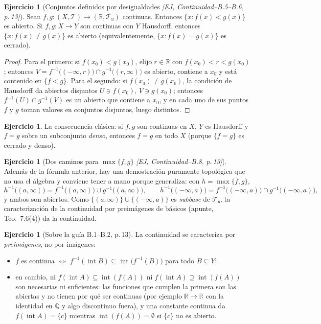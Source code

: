 \documentclass[11pt,a4paper]{article}
\theoremstyle{definition}
\newtheorem{ejercicio}[definicion]{Ejercicio}
\theoremstyle{plain}
\newcommand{\fnt}[1]{{\normalfont\small\itshape\color{gray!150!black}[#1]}}
\newcommand{\R}{\mathbb{R}}
\newcommand{\Q}{\mathbb{Q}}
\newcommand{\intr}{\operatorname{int}}
\newcommand{\tp}{\mathcal{T}}
\begin{document}
\begin{ejercicio}[Conjuntos definidos por desigualdades \fnt{EJ, Continuidad--B.5--B.6, p.\,13}]
Sean $f,g:(X,\tp)\to(\R,\tp_u)$ continuas. Entonces $\{x: f(x)<g(x)\}$ es abierto. Si $f,g:X\to Y$ son continuas con $Y$ Hausdorff, entonces $\{x: f(x)\ne g(x)\}$ es abierto (equivalentemente, $\{x: f(x)=g(x)\}$ es cerrado).
\end{ejercicio}

\begin{proof}
Para el primero: si $f(x_0)<g(x_0)$, elijo $r\in\R$ con $f(x_0)<r<g(x_0)$; entonces
$V=f^{-1}\big((-\infty,r)\big)\cap g^{-1}\big((r,\infty)\big)$ es abierto, contiene a $x_0$ y está contenido en $\{f<g\}$.
Para el segundo: si $f(x_0)\ne g(x_0)$, la condición de Hausdorff da abiertos disjuntos $U\ni f(x_0)$, $V\ni g(x_0)$; entonces $f^{-1}(U)\cap g^{-1}(V)$ es un abierto que contiene a $x_0$, y en cada uno de sus puntos $f$ y $g$ toman valores en conjuntos disjuntos, luego distintos.
\end{proof}

\begin{ejercicio}
La consecuencia clásica: si $f,g$ son continuas en $X$, $Y$ es Hausdorff y $f=g$ sobre un subconjunto \emph{denso}, entonces $f=g$ en todo $X$ (porque $\{f=g\}$ es cerrado y denso).
\end{ejercicio}

\begin{ejercicio}[Dos caminos para $\max\{f,g\}$ \fnt{EJ, Continuidad--B.8, p.\,13}]
Además de la fórmula anterior, hay una demostración puramente topológica que no usa el álgebra y conviene tener a mano porque generaliza: con $h=\max\{f,g\}$,
\[
h^{-1}\big((a,\infty)\big)=f^{-1}\big((a,\infty)\big)\cup g^{-1}\big((a,\infty)\big),
\qquad
h^{-1}\big((-\infty,a)\big)=f^{-1}\big((-\infty,a)\big)\cap g^{-1}\big((-\infty,a)\big),
\]
y ambos son abiertos. Como $\{(a,\infty)\}\cup\{(-\infty,a)\}$ es \emph{subbase} de $\tp_u$, la caracterización de la continuidad por preimágenes de básicos (apunte, Teo.\ 7.6(4)) da la continuidad.
\end{ejercicio}

\begin{ejercicio}[Sobre la guía B.1--B.2, p.\,13]
La continuidad se caracteriza por \emph{preimágenes}, no por imágenes:
\begin{itemize}[leftmargin=1.4em,itemsep=1pt]
\item $f$ es continua $\iff$ $f^{-1}(\intr B)\subseteq \intr\big(f^{-1}(B)\big)$ para todo $B\subseteq Y$;
\item en cambio, ni $f(\intr A)\subseteq\intr(f(A))$ ni $f(\intr A)\supseteq\intr(f(A))$ son necesarias ni suficientes: las funciones que cumplen la primera son las abiertas y no tienen por qué ser continuas (por ejemplo $\R\to\R$ con la identidad en $\Q$ y algo discontinuo fuera), y una constante continua da $f(\intr A)=\{c\}$ mientras $\intr(f(A))=\emptyset$ si $\{c\}$ no es abierto.
\end{itemize}
\end{ejercicio}
\end{document}
